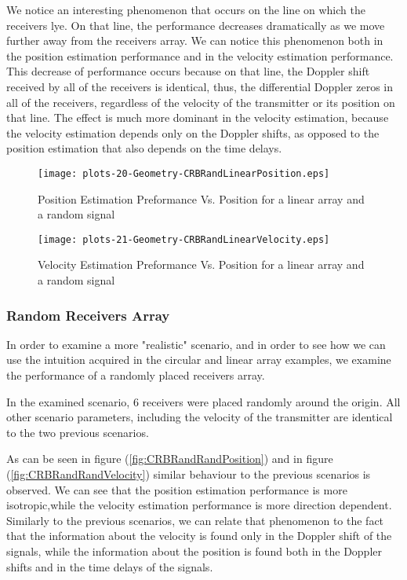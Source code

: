 We notice an interesting phenomenon that occurs on the line on which the receivers lye. On that line, the performance decreases dramatically as we move further away from the receivers array. We can notice this phenomenon both in the position estimation performance and in the velocity estimation performance. This decrease of performance occurs because on that line, the Doppler shift received by all of the receivers is identical, thus, the differential Doppler zeros in all of the receivers, regardless of the velocity of the transmitter or its position on that line. The effect is much more dominant in the velocity estimation, because the velocity estimation depends only on the Doppler shifts, as opposed to the position estimation that also depends on the time delays.

\begin{figure}
\begin{center}
\texttt{[image: plots-20-Geometry-CRBRandLinearPosition.eps]} 
\end{center}
\caption[Position Estimation Preformance Vs. Position for a linear array and a random signal]
{Position Estimation Preformance Vs. Position for a linear array and a random signal}
\label{fig:CRBRandLinearPosition}
\end{figure}

\begin{figure}
\begin{center}
\texttt{[image: plots-21-Geometry-CRBRandLinearVelocity.eps]} 
\end{center}
\caption[Velocity Estimation Preformance Vs. Position for a linear array and a random signal]
{Velocity Estimation Preformance Vs. Position for a linear array and a random signal}
\label{fig:CRBRandLinearVelocity}
\end{figure}

\subsubsection*{Random Receivers Array}
In order to examine a more "realistic" scenario, and in order to see how we can use the intuition acquired in the circular and linear array examples, we examine the performance of a randomly placed receivers array.

In the examined scenario, 6 receivers were placed randomly around the origin. All other scenario parameters, including the velocity of the transmitter are identical to the two previous scenarios.

As can be seen in figure (\ref{fig:CRBRandRandPosition}) and in figure (\ref{fig:CRBRandRandVelocity}) similar behaviour to the previous scenarios is observed.
We can see that the position estimation performance is more isotropic,while the velocity estimation performance is more direction dependent. Similarly to the previous scenarios, we can relate that phenomenon to the fact that the information about the velocity is found only in the Doppler shift of the signals, while the information about the position is found both in the Doppler shifts and in the time delays of the signals.

